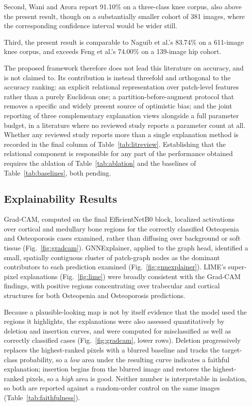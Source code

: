 \documentclass[journal]{IEEEtran}
\begin{document}
Second, Wani and Arora \cite{wani2023osteoporosis} report 91.10\% on a
three-class knee corpus, also above the present result, though on a
substantially smaller cohort of 381 images, where the corresponding confidence
interval would be wider still.

Third, the present result is comparable to Naguib et al.'s
\cite{Naguib2024} 83.74\% on a 611-image knee corpus, and exceeds Feng et al.'s
\cite{Feng2024} 74.00\% on a 139-image hip cohort.

The proposed framework therefore does not lead this literature on accuracy, and
is not claimed to. Its contribution is instead threefold and orthogonal to the
accuracy ranking: an explicit relational representation over patch-level
features rather than a purely Euclidean one; a partition-before-augment protocol
that removes a specific and widely present source of optimistic bias; and the
joint reporting of three complementary explanation views alongside a full
parameter budget, in a literature where no reviewed study reports a parameter
count at all. Whether any reviewed study reports more than a single explanation
method is recorded in the final column of Table~\ref{tab:litreview}.
Establishing that the relational component is
responsible for any part of the performance obtained requires the ablation of
Table~\ref{tab:ablation} and the baselines of Table~\ref{tab:baselines}, both
pending.

\subsection{Explainability Results}
Grad-CAM, computed on the final EfficientNetB0 block, localized activations over
cortical and medullary bone regions for the correctly classified Osteopenia and
Osteoporosis cases examined, rather than diffusing over background or soft
tissue (Fig.~\ref{fig:gradcam}). GNNExplainer, applied to the graph head,
identified a small, spatially contiguous cluster of patch-graph nodes as the
dominant contributors to each prediction examined
(Fig.~\ref{fig:gnnexplainer}). LIME's super-pixel explanations
(Fig.~\ref{fig:lime}) were broadly consistent with the Grad-CAM findings, with
positive regions concentrating over trabecular and cortical structures for both
Osteopenia and Osteoporosis predictions.

Because a plausible-looking map is not by itself evidence that the model used
the regions it highlights, the explanations were also assessed quantitatively by
deletion and insertion curves, and were computed for misclassified as well as
correctly classified cases (Fig.~\ref{fig:gradcam}, lower rows). Deletion
progressively replaces the highest-ranked pixels with a blurred baseline and
tracks the target-class probability, so a \emph{low} area under the resulting
curve indicates a faithful explanation; insertion begins from the blurred image
and restores the highest-ranked pixels, so a \emph{high} area is good. Neither
number is interpretable in isolation, so both are reported against a
random-order control on the same images
(Table~\ref{tab:faithfulness}).
\end{document}
